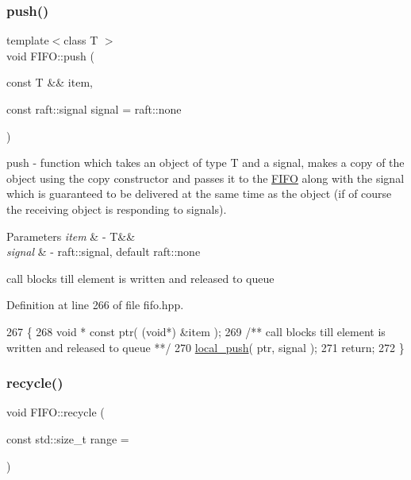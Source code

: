 \subsubsection{\texorpdfstring{push()}{push()}\hspace{0.1cm}{\footnotesize\ttfamily [2/2]}}
{\footnotesize\ttfamily template$<$class T $>$ \\
void F\+I\+F\+O\+::push (\begin{DoxyParamCaption}\item[{const T \&\&}]{item,  }\item[{const raft\+::signal}]{signal = {\ttfamily raft\+:\+:none} }\end{DoxyParamCaption})\hspace{0.3cm}{\ttfamily [inline]}}

push -\/ function which takes an object of type T and a signal, makes a copy of the object using the copy constructor and passes it to the \hyperlink{class_f_i_f_o}{F\+I\+FO} along with the signal which is guaranteed to be delivered at the same time as the object (if of course the receiving object is responding to signals). 
\begin{DoxyParams}{Parameters}
{\em item} & -\/ T\&\& \\
\hline
{\em signal} & -\/ raft\+::signal, default raft\+::none \\
\hline
\end{DoxyParams}
call blocks till element is written and released to queue 

Definition at line 266 of file fifo.\+hpp.


\begin{DoxyCode}
267    \{
268       \textcolor{keywordtype}{void} * \textcolor{keyword}{const} ptr( (\textcolor{keywordtype}{void}*) &item );\textcolor{comment}{}
269 \textcolor{comment}{      /** call blocks till element is written and released to queue **/}
270       \hyperlink{class_f_i_f_o_a4ef48ce2cb02e8bd5d381bb65687e6cb}{local\_push}( ptr, signal );
271       \textcolor{keywordflow}{return};
272    \}
\end{DoxyCode}
\hypertarget{class_f_i_f_o_abac84fe2d1e4b83df8571a97abf9a713}{}\label{class_f_i_f_o_abac84fe2d1e4b83df8571a97abf9a713} 
\subsubsection{\texorpdfstring{recycle()}{recycle()}}
{\footnotesize\ttfamily void F\+I\+F\+O\+::recycle (\begin{DoxyParamCaption}\item[{const std\+::size\+\_\+t}]{range = {} }\end{DoxyParamCaption})\hspace{0.3cm}{\ttfamily [inline]}}

